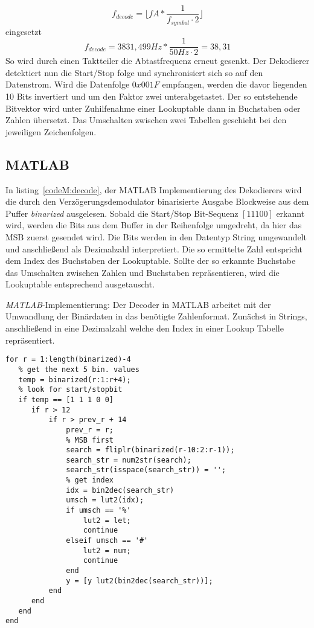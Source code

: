 \documentclass{article}
\begin{document}
$$
f_{decode} = \lfloor fA * \frac{1}{f_{symbol} \cdot 2}\rfloor 
$$
eingesetzt
$$
f_{decode} = 3831,499Hz * \frac{1}{50Hz\cdot 2} = 38,31
$$
So wird durch einen Taktteiler die Abtastfrequenz erneut gesenkt. Der Dekodierer detektiert nun die Start/Stop folge und synchronisiert sich so auf den Datenstrom. Wird die Datenfolge $0x001F$ empfangen, werden die davor liegenden 10 Bits invertiert und um den Faktor zwei unterabgetastet. Der so entstehende Bitvektor wird unter Zuhilfenahme einer Lookuptable dann in Buchstaben oder Zahlen übersetzt. Das Umschalten zwischen zwei Tabellen geschieht bei den jeweiligen Zeichenfolgen.
\subsection{MATLAB}
In listing~\ref{codeM:decode}, der MATLAB Implementierung des Dekodierers wird die durch den Verzögerungsdemodulator binarisierte Ausgabe
Blockweise aus dem Puffer \textit{binarized} ausgelesen. Sobald die Start/Stop Bit-Sequenz $[1 1 1 0 0]$ erkannt wird, werden die Bits aus dem Buffer
in der Reihenfolge umgedreht, da hier das MSB zuerst gesendet wird. Die Bits werden in den Datentyp String umgewandelt und anschließend
als Dezimalzahl interpretiert. Die so ermittelte Zahl entspricht dem Index des Buchstaben der Lookuptable. 
Sollte der so erkannte Buchstabe das Umschalten zwischen Zahlen und Buchstaben repräsentieren, wird die Lookuptable
entsprechend ausgetauscht. 
\begin{listing}\label{codeM:decode}
    \caption{\textit{MATLAB}-Implementierung: Der Decoder in MATLAB arbeitet mit der Umwandlung der Binärdaten in das benötigte Zahlenformat. Zunächst in Strings, 
    anschließend in eine Dezimalzahl welche den Index in einer Lookup Tabelle repräsentiert.}
    \begin{verbatim}
for r = 1:length(binarized)-4
   % get the next 5 bin. values
   temp = binarized(r:1:r+4);
   % look for start/stopbit
   if temp == [1 1 1 0 0]
      if r > 12
          if r > prev_r + 14 
              prev_r = r;
              % MSB first
              search = fliplr(binarized(r-10:2:r-1));
              search_str = num2str(search);
              search_str(isspace(search_str)) = '';
              % get index
              idx = bin2dec(search_str)
              umsch = lut2(idx);
              if umsch == '%'
                  lut2 = let;
                  continue
              elseif umsch == '#'
                  lut2 = num;
                  continue
              end
              y = [y lut2(bin2dec(search_str))];
          end
      end
   end
end
\end{verbatim}
\end{listing}
\end{document}
